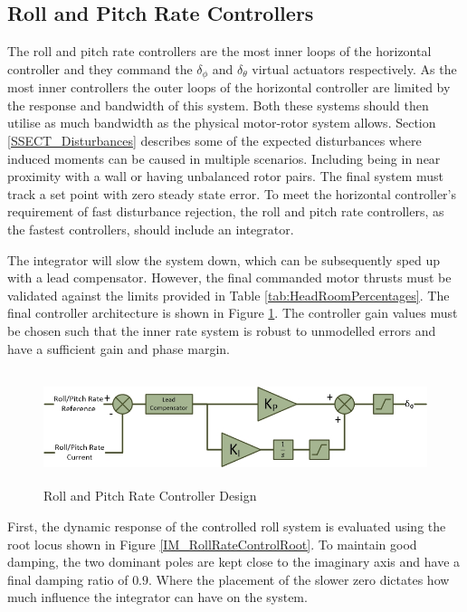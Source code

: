 \documentclass[12pt]{report}
\begin{document}
\subsection{Roll and Pitch Rate Controllers}
The roll and pitch rate controllers are the most inner loops of the horizontal controller and they command the $\delta_\phi$ and $\delta_\theta$ virtual actuators respectively. As the most inner controllers the outer loops of the horizontal controller are limited by the response and bandwidth of this system. Both these systems should then utilise as much bandwidth as the physical motor-rotor system allows. Section \ref{SSECT_Disturbances} describes some of the expected disturbances where induced moments can be caused in multiple scenarios. Including being in near proximity with a wall or having unbalanced rotor pairs. The final system must track a set point with zero steady state error. To meet the horizontal controller's requirement of fast disturbance rejection, the roll and pitch rate controllers, as the fastest controllers, should include an integrator. 

The integrator will slow the system down, which can be subsequently sped up with a lead compensator. However, the final commanded motor thrusts must be validated against the limits provided in Table \ref{tab:HeadRoomPercentages}. The final controller architecture is shown in Figure \ref{IM_RollPitchRateController}. The controller gain values must be chosen such that the inner rate system is robust to unmodelled errors and have a sufficient gain and phase margin.

\begin{figure}[H]
	\centering
	\includegraphics[height = 3.3cm]{../References/Diagrams/RollRateController.jpg}
	\caption{Roll and Pitch Rate Controller Design}
	\label{IM_RollPitchRateController}
\end{figure}	

First, the dynamic response of the controlled roll system is evaluated using the root locus shown in Figure \ref{IM_RollRateControlRoot}. To maintain good damping, the two dominant poles are kept close to the imaginary axis and have a final damping ratio of $0.9$. Where the placement of the slower zero dictates how much influence the integrator can have on the system. 
\end{document}
